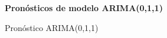 %
%
\begin{figure}[h]
	\centering
	\textbf{Pronósticos de modelo ARIMA(0,1,1)}\par\medskip
	\caption{Pronóstico ARIMA(0,1,1)}\label{fig25}
\end{figure}
